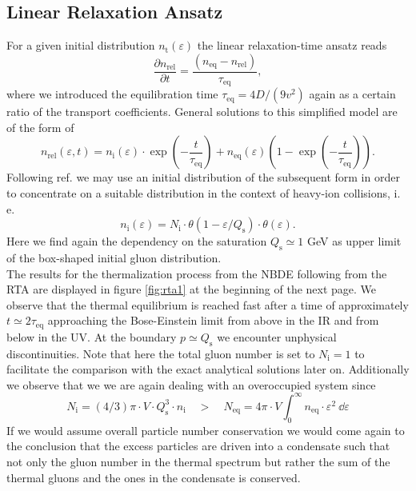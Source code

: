 \subsection{Linear Relaxation Ansatz}
For a given initial distribution $n_{\mathrm{t}}(\varepsilon)$  the linear relaxation-time ansatz reads 
\begin{equation}
	\frac{\partial n_{\mathrm{rel}}}{\partial t} = \frac{(n_{\mathrm{eq}} - n_{\mathrm{
rel}})}{\tau_{\mathrm{eq}}},
\end{equation}
where we introduced the equilibration time $\tau_{\mathrm{eq}} = 4D/(9v^2)$ again as a certain ratio of the transport coefficients. General solutions to this simplified model are of the form of
\begin{equation}
	n_{\mathrm{rel}}(\varepsilon,t) = n_{\mathrm{i}}(\varepsilon)\cdot\exp\left(-\frac{t}{\tau_{\mathrm{eq}}}\right) +  n_{\mathrm{eq}}(\varepsilon)\left(1-\exp\left(-\frac{t}{\tau_{\mathrm{eq}}}\right)\right).
\end{equation}
Following ref. \cite{Mueller1999} we may use an initial distribution of the subsequent form in order to concentrate on a suitable distribution in the context of heavy-ion collisions, i.\,e.
\begin{equation}
	n_{\mathrm{i}}(\varepsilon) = N_{\mathrm{i}}\cdot\theta\left(1-\varepsilon/Q_{\mathrm{s}}\right)\cdot\theta(\varepsilon) \label{eqn:rta_initial}.
\end{equation}
Here we find again the dependency on the saturation $Q_{\mathrm{s}}\simeq 1$ GeV as upper limit of the box-shaped initial gluon distribution.\\
The results for the thermalization process from the NBDE following from the RTA are displayed in figure \ref{fig:rta1} at the beginning of the next page. We observe that the thermal equilibrium is reached fast after a time of approximately $t\simeq 2\tau_{\mathrm{eq}}$ approaching the Bose-Einstein limit from above in the IR and from below in the UV. At the boundary $p\simeq Q_{\mathrm{s}}$ we encounter unphysical discontinuities. Note that here the total gluon number is set to $N_{\mathrm{i}}=1$ to facilitate the comparison with the exact analytical solutions later on. Additionally we observe that we we are again dealing with an overoccupied system since 
\begin{equation}
	N_{\mathrm{i}} = (4/3)\pi\cdot V\cdot Q_{\mathrm{s}}^3\cdot n_{\mathrm{i}}\quad >\quad N_{\mathrm{eq}} = 4\pi\cdot V \int_0^{\infty} n_{\mathrm{eq}}\cdot\varepsilon^2\ \dd\varepsilon
\end{equation}
If we would assume overall particle number conservation we would come again to the conclusion that the excess particles are driven into a condensate such that not only the gluon number in the thermal spectrum but rather the sum of the thermal gluons and the ones in the condensate is conserved.


